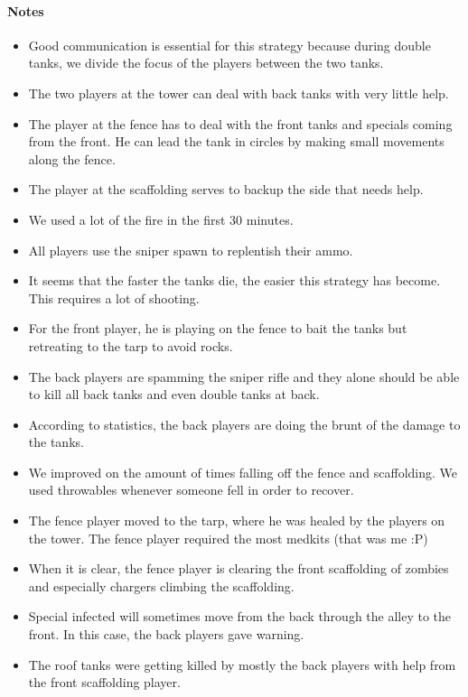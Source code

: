 \paragraph{Notes}
\begin{itemize}
\item Good communication is essential for this strategy because during double tanks, we divide the focus of the players between the two tanks.
\item The two players at the tower can deal with back tanks with very little help.
\item The player at the fence has to deal with the front tanks and specials coming from the front. He can lead the tank in circles by making small movements along the fence.
\item The player at the scaffolding serves to backup the side that needs help.
\item We used a lot of the fire in the first 30 minutes.
\item All players use the sniper spawn to replentish their ammo.
\item It seems that the faster the tanks die, the easier this strategy has become. This requires a lot of shooting.
\item For the front player, he is playing on the fence to bait the tanks but retreating to the tarp to avoid rocks.
\item The back players are spamming the sniper rifle and they alone should be able to kill all back tanks and even double tanks at back.
\item According to statistics, the back players are doing the brunt of the damage to the tanks.
\item We improved on the amount of times falling off the fence and scaffolding. We used throwables whenever someone fell in order to recover.
\item The fence player moved to the tarp, where he was healed by the players on the tower. The fence player required the most medkits (that was me :P)
\item When it is clear, the fence player is clearing the front scaffolding of zombies and especially chargers climbing the scaffolding.
\item Special infected will sometimes move from the back through the alley to the front. In this case, the back players gave warning.
\item The roof tanks were getting killed by mostly the back players with help from the front scaffolding player.
\end{itemize}

